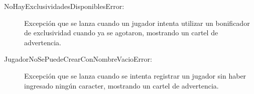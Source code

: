 \documentclass[titlepage,a4paper]{article}
\begin{document}
\begin{description}
\item[NoHayExclusividadesDisponiblesError:] Excepción que se lanza cuando un jugador intenta utilizar un bonificador de exclusividad cuando ya se agotaron, mostrando un cartel de advertencia.

\end{description}

\begin{description}
\item[JugadorNoSePuedeCrearConNombreVacioError:] Excepción que se lanza cuando se intenta registrar un jugador sin haber ingresado ningún caracter, mostrando un cartel de advertencia.

\end{description}
\end{document}
